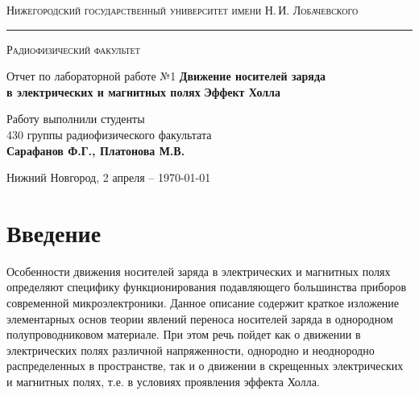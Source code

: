 \documentclass[a4paper,14pt]{extarticle}
\def\labauthors{Сарафанов Ф.Г., Платонова М.В.}
\def\labnumber{1}
\begin{document}
\begin{titlepage}
\begin{center}
{\small\textsc{Нижегородский государственный университет имени Н.\,И. Лобачевского}}
\vskip 2pt \hrule \vskip 3pt
{\small\textsc{Радиофизический факультет}}

\vfill


{{\large Отчет по лабораторной работе №\labnumber}\vskip 12pt {\LARGE \bfseries Движение носителей заряда\\[0.2em]  в электрических и магнитных полях}\vskip 12pt {\Huge \bfseries Эффект Холла}}

	
\vspace{2cm}
{\large Работу выполнили студенты \\[-0.25em] 430 группы радиофизического факультата \\[0.5em] {\Large \bfseries \labauthors}}



\end{center}

\vfill
	
	
	
\begin{center}
	{Нижний Новгород, 2 апреля -- \today}
\end{center}

\end{titlepage}
\tableofcontents
\newpage



\section*{Введение}
	Особенности движения носителей заряда в электрических и магнитных
полях определяют специфику функционирования подавляющего большинства
приборов современной микроэлектроники. Данное описание содержит краткое
изложение элементарных основ теории явлений переноса носителей заряда в 
однородном полупроводниковом материале. При этом речь пойдет как о движении
в электрических полях различной напряженности, однородно и неоднородно
распределенных в пространстве, так и о движении в скрещенных электрических
и магнитных полях, т.е. в условиях проявления эффекта Холла.
\end{document}
